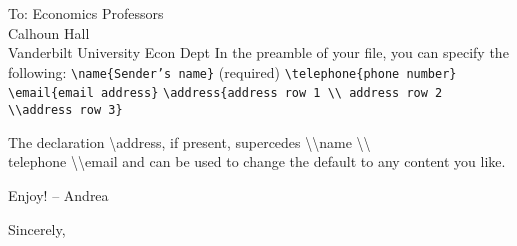 \documentclass{letter}
\begin{document}
\begin{letter}{
To: Economics Professors\\
Calhoun Hall \\
Vanderbilt University Econ Dept}
In the preamble of your file, you can specify the following:\newline
\newline
\texttt{\textbackslash name\{Sender's name\}} (required) \newline
\texttt{\textbackslash telephone\{phone number\}} \newline
\texttt{\textbackslash email\{email address\}}\newline
\texttt{\textbackslash address\{address row 1 \textbackslash \textbackslash 
address row 2 \textbackslash \textbackslash  address row 3\}}

The declaration \textbackslash address, if present, supercedes 
\textbackslash \textbackslash name \textbackslash \textbackslash 
\\telephone \textbackslash \textbackslash email and can be used to change the
default to any content you like.\bigskip




Enjoy! -- Andrea

\closing{
Sincerely,
}

\end{letter}
\end{document}
